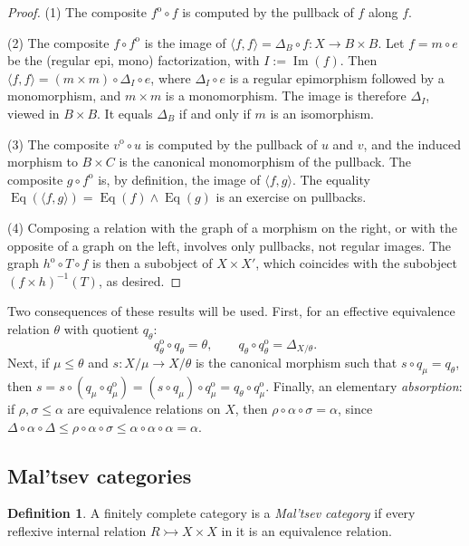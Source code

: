 \documentclass[11pt,a4paper]{article}
\theoremstyle{plain}
\theoremstyle{definition}
\newtheorem{definition}[theoreme]{Definition}
\theoremstyle{remark}
\theoremstyle{plain}
\newcommand{\Eq}{\operatorname{Eq}}
\newcommand{\im}{\operatorname{Im}}
\newcommand{\op}{\mathrm{o}}
\begin{document}
\begin{proof}
(1) The composite $f^{\op} \circ f$ is computed by the pullback
of $f$ along $f$.

(2) The composite $f \circ f^{\op}$ is the image of
$\langle f,f\rangle = \Delta_B \circ f \colon X \to B \times B$. Let
$f = m \circ e$ be the (regular epi, mono) factorization, with
$I := \im (f)$. Then
$\langle f, f\rangle = (m \times m) \circ \Delta_I \circ e$, where
$\Delta_I \circ e$ is a regular epimorphism followed by a monomorphism, and
$m \times m$ is a monomorphism.  The image is therefore 
$\Delta_I$, viewed in $B \times B$. It equals $\Delta_B$ if and only if $m$
is an isomorphism.

(3) The composite $v^{\op} \circ u$ is computed by the pullback
of $u$ and $v$, and the induced morphism to $B \times C$ is the canonical
monomorphism of the pullback. The composite $g \circ f^{\op}$ is,
by definition, the image of $\langle f,g\rangle$. The equality $\Eq(\langle f,g\rangle) = \Eq(f) \wedge \Eq(g)$ is an exercise on pullbacks.

(4) Composing a relation with the graph of a morphism on the right, or with the
opposite of a graph on the left, involves only pullbacks, not regular images. 
The graph $h^{\op} \circ T \circ f$ is then a subobject of $X \times X'$, which coincides with the
subobject
$(f\times h)^{-1}(T)$, as desired.
\end{proof}

Two consequences of these results will be used. First, for an effective equivalence relation $\theta$ with
quotient $q_\theta$:
\[
q_\theta^{\op} \circ q_\theta = \theta,
\qquad
q_\theta \circ q_\theta^{\op} = \Delta_{X/\theta}.
\]
Next, if $\mu \le \theta$ and $s \colon X/\mu \to X/\theta$ is the canonical
morphism such that $s \circ q_\mu = q_\theta$, then
$s = s \circ (q_\mu \circ q_\mu^{\op})
= (s \circ q_\mu) \circ q_\mu^{\op}
= q_\theta \circ q_\mu^{\op}$. Finally, an elementary \emph{absorption}: if $\rho, \sigma \le
\alpha$ are equivalence relations on $X$, then
$\rho \circ \alpha \circ \sigma = \alpha$, since
$\Delta \circ \alpha \circ \Delta \le \rho \circ \alpha \circ \sigma
\le \alpha \circ \alpha \circ \alpha = \alpha$.

\subsection{Mal'tsev categories}

\begin{definition}
A finitely complete category is a \emph{Mal'tsev category} if every reflexive internal
relation $R \rightarrowtail X \times X$ in it is an equivalence relation.
\end{definition}
\end{document}
